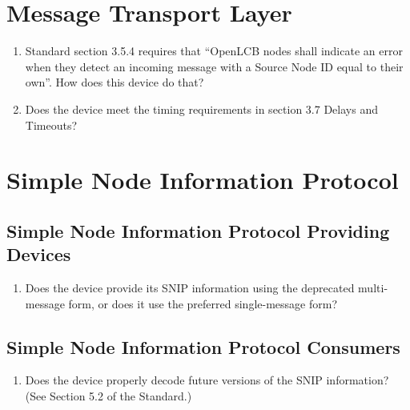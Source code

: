 \section{Message Transport Layer}
    \begin{enumerate}
        \item Standard section 3.5.4 requires that ``OpenLCB nodes shall indicate an 
            error when they detect an incoming message with a Source Node ID
            equal to their own''. How does this device do that?
        \item Does the device meet the timing requirements in section 3.7 Delays and Timeouts?
    \end{enumerate}

\section{Simple Node Information Protocol}
    \subsection{Simple Node Information Protocol Providing Devices}
        \begin{enumerate}
            \item Does the device provide its SNIP information using
                the deprecated multi-message form, or does it use
                the preferred single-message form?
        \end{enumerate}
    \subsection{Simple Node Information Protocol Consumers}
        \begin{enumerate}
            \item Does the device properly decode future versions of the SNIP
                information? (See Section 5.2 of the Standard.)
        \end{enumerate}


